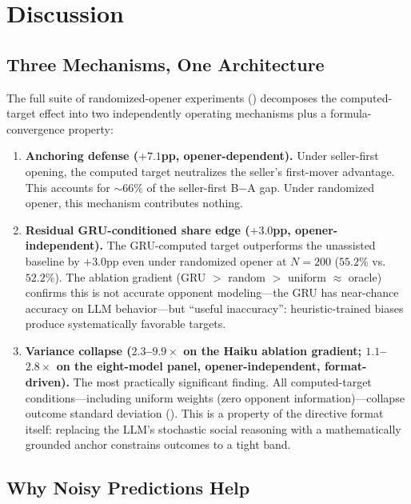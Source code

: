 \documentclass[11pt,a4paper]{article}
\begin{document}
\section{Discussion}
\label{sec:discussion}

\subsection{Three Mechanisms, One Architecture}

The full suite of randomized-opener experiments () decomposes the computed-target effect into two independently operating mechanisms plus a formula-convergence property:

\begin{enumerate}
\item \textbf{Anchoring defense ($+7.1$pp, opener-dependent).} Under seller-first opening, the computed target neutralizes the seller's first-mover advantage. This accounts for ${\sim}66\%$ of the seller-first B$-$A gap. Under randomized opener, this mechanism contributes nothing.
\item \textbf{Residual GRU-conditioned share edge ($+3.0$pp, opener-independent).} The GRU-computed target outperforms the unassisted baseline by $+3.0$pp even under randomized opener at $N = 200$ ($55.2\%$ vs.\ $52.2\%$). The ablation gradient (GRU $>$ random $>$ uniform $\approx$ oracle) confirms this is not accurate opponent modeling---the GRU has near-chance accuracy on LLM behavior---but ``useful inaccuracy'': heuristic-trained biases produce systematically favorable targets.
\item \textbf{Variance collapse ($2.3$--$9.9\times$ on the Haiku ablation gradient; $1.1$--$2.8\times$ on the eight-model panel, opener-independent, format-driven).} The most practically significant finding. All computed-target conditions---including uniform weights (zero opponent information)---collapse outcome standard deviation (). This is a property of the directive format itself: replacing the LLM's stochastic social reasoning with a mathematically grounded anchor constrains outcomes to a tight band.
\end{enumerate}

\subsection{Why Noisy Predictions Help}
\label{sec:amplification}
\end{document}
